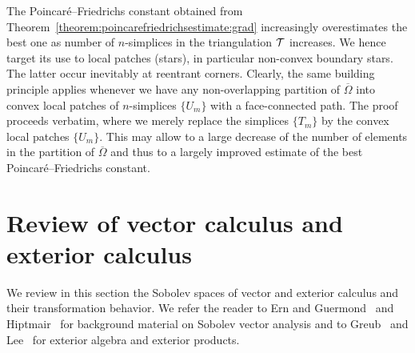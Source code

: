 \documentclass[10pt,a4paper]{article}
\begin{document}
\begin{remark}
    The Poincar\'e--Friedrichs constant obtained from Theorem~\ref{theorem:poincarefriedrichsestimate:grad} increasingly overestimates the best one as number of $n$-simplices in the triangulation ${\mathcal T}$ increases. We hence target its use to local patches (stars), in particular non-convex boundary stars. The latter occur inevitably at reentrant corners. Clearly, the same building principle applies whenever we have any non-overlapping partition of $\overline \Omega$ into convex local patches of $n$-simplices $\{ U_m \}$ with a face-connected path. The proof proceeds verbatim, where we merely replace the simplices $\{ T_{m} \}$ by the convex local patches $\{ U_m \}$. This may allow to a large decrease of the number of elements in the partition of $\overline \Omega$ and thus to a largely improved estimate of the best Poincar\'e--Friedrichs constant. 
\end{remark}



    























\section{Review of vector calculus and exterior calculus}\label{section:calculus}


We review in this section the Sobolev spaces of vector and exterior calculus and their transformation behavior. We refer the reader to Ern and Guermond~\cite{ern2021finite} and Hiptmair~\cite{hiptmair2002finite} for background material on Sobolev vector analysis and to Greub~\cite{greub1967multilinear} and Lee~\cite{lee2012smooth} for exterior algebra and exterior products. 
\end{document}
